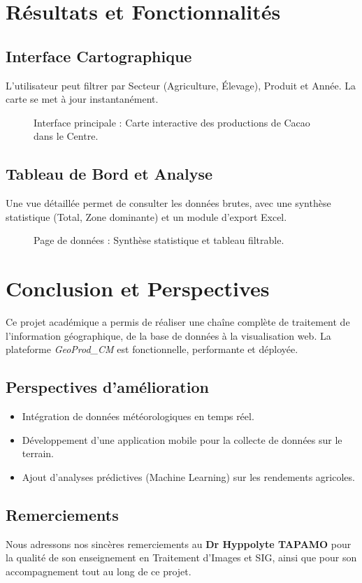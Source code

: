 \documentclass[a4paper,12pt]{report}
\begin{document}
\chapter{Résultats et Fonctionnalités}

\section{Interface Cartographique}
L'utilisateur peut filtrer par Secteur (Agriculture, Élevage), Produit et Année. La carte se met à jour instantanément.
\begin{figure}[H]
    \centering
    \caption{Interface principale : Carte interactive des productions de Cacao dans le Centre.}
\end{figure}

\section{Tableau de Bord et Analyse}
Une vue détaillée permet de consulter les données brutes, avec une synthèse statistique (Total, Zone dominante) et un module d'export Excel.
\begin{figure}[H]
    \centering
    \caption{Page de données : Synthèse statistique et tableau filtrable.}
\end{figure}

\chapter{Conclusion et Perspectives}
Ce projet académique a permis de réaliser une chaîne complète de traitement de l'information géographique, de la base de données à la visualisation web. La plateforme \textit{GeoProd\_CM} est fonctionnelle, performante et déployée.

\section*{Perspectives d'amélioration}
\begin{itemize}
    \item Intégration de données météorologiques en temps réel.
    \item Développement d'une application mobile pour la collecte de données sur le terrain.
    \item Ajout d'analyses prédictives (Machine Learning) sur les rendements agricoles.
\end{itemize}

\section*{Remerciements}
Nous adressons nos sincères remerciements au \textbf{Dr Hyppolyte TAPAMO} pour la qualité de son enseignement en Traitement d'Images et SIG, ainsi que pour son accompagnement tout au long de ce projet.
\end{document}
